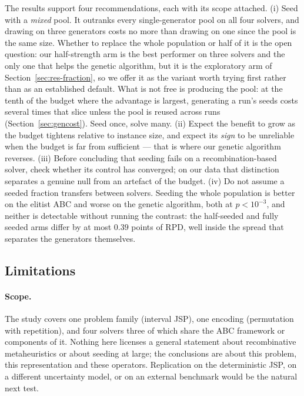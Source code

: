\documentclass[review]{elsarticle}
\begin{document}
The results support four recommendations, each with its scope attached.
(i) Seed with a \emph{mixed} pool. It outranks every single-generator pool
on all four solvers, and drawing on three generators costs no more than
drawing on one since the pool is the same size. Whether to replace the whole
population or half of it is the open question: our half-strength arm is the
best performer on three solvers and the only one that helps the genetic
algorithm, but it is the exploratory arm of
Section~\ref{sec:res-fraction}, so we offer it as the variant worth trying
first rather than as an established default. What is not free is producing
the pool: at the tenth of the budget where the advantage is largest,
generating a run's seeds costs several times that slice unless the pool is
reused across runs (Section~\ref{sec:gencost}). Seed once, solve many. (ii)
Expect the benefit to grow as the budget tightens relative to instance
size, and expect its \emph{sign} to be unreliable when the budget is far
from sufficient --- that is where our genetic algorithm reverses. (iii)
Before concluding that seeding fails on a recombination-based solver,
check whether its control has converged; on our data that distinction
separates a genuine null from an artefact of the budget. (iv) Do not assume
a seeded fraction transfers between solvers. Seeding the whole population
is better on the elitist ABC and worse on the genetic algorithm, both at
$p<10^{-3}$, and neither is detectable without running the contrast: the
half-seeded and fully seeded arms differ by at most $0.39$ points of RPD,
well inside the spread that separates the generators themselves.

\subsection{Limitations}\label{sec:limits}

\paragraph{Scope.} The study covers one problem family (interval JSP), one
encoding (permutation with repetition), and four solvers three of which
share the ABC framework or components of it. Nothing here licenses a
general statement about recombinative metaheuristics or about seeding at
large; the conclusions are about this problem, this representation and
these operators. Replication on the deterministic JSP, on a different
uncertainty model, or on an external benchmark would be the natural next
test.
\end{document}
